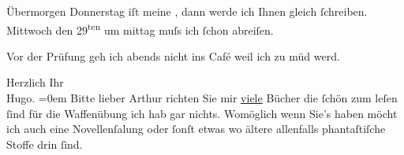 \pstart
           Übermorgen Donnerstag iſt meine \label{K_L00808-2v}\label{K_L00808-2}, dann werde {\pb}ich Ihnen gleich{ }ſchreiben. Mittwoch den 29\textsuperscript{ten} um mittag muſs ich{ }ſchon abreiſen.\pend
           
\pstart
           Vor der Prüfung geh ich abends nicht ins Café weil ich zu müd werd.\pend
           
\pstart
           Herzlich Ihr{\\[\baselineskip]}\spacefill\mbox{Hugo.}\pend
           \leftskip=0em{}
\pstart
           \noindent{}Bitte lieber Arthur richten Sie {\pb}mir \uline{viele} Bücher die{ }ſchön zum leſen{ }ſind für
                  die Waffenübung ich hab gar nichts. Womöglich wenn Sie’s haben möcht ich auch eine
                     Novellenſa{\geminationm}lung oder{ }ſonſt etwas wo ältere
                  allenfalls phantaſtiſche Stoffe drin{ }ſind.\pend
           \endnumbering{}  \newcommand{\dateiname}{L00808}\newcommand{\titel}{Hugo von Hofmannsthal an Arthur Schnitzler, [21. 6. 1898]}\newcommand{\editorInnen}{Martin Anton Müller und Gerd-Hermann Susen}
